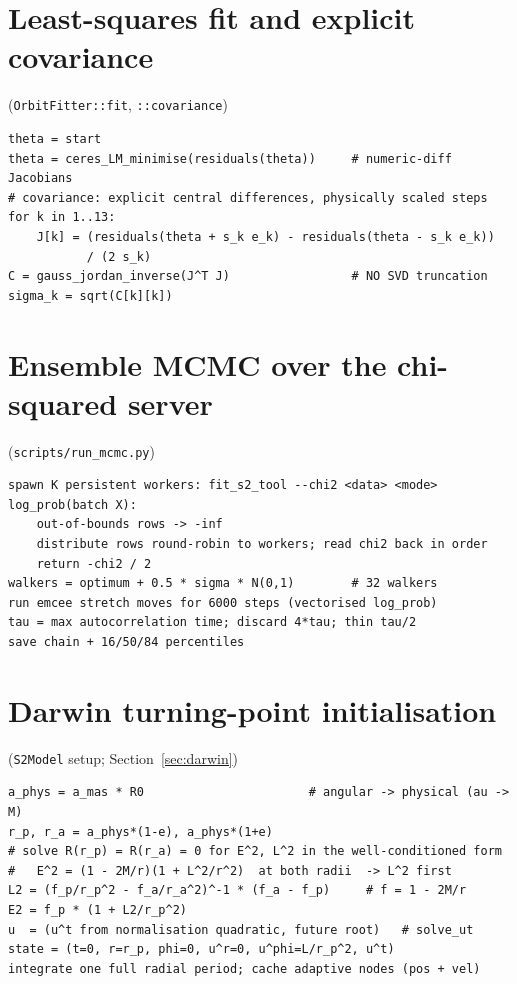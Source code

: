 \section{Least-squares fit and explicit covariance}
(\texttt{OrbitFitter::fit}, \texttt{::covariance})

\begin{verbatim}
theta = start
theta = ceres_LM_minimise(residuals(theta))     # numeric-diff Jacobians
# covariance: explicit central differences, physically scaled steps
for k in 1..13:
    J[k] = (residuals(theta + s_k e_k) - residuals(theta - s_k e_k))
           / (2 s_k)
C = gauss_jordan_inverse(J^T J)                 # NO SVD truncation
sigma_k = sqrt(C[k][k])
\end{verbatim}

\section{Ensemble MCMC over the chi-squared server}
(\texttt{scripts/run\_mcmc.py})

\begin{verbatim}
spawn K persistent workers: fit_s2_tool --chi2 <data> <mode>
log_prob(batch X):
    out-of-bounds rows -> -inf
    distribute rows round-robin to workers; read chi2 back in order
    return -chi2 / 2
walkers = optimum + 0.5 * sigma * N(0,1)        # 32 walkers
run emcee stretch moves for 6000 steps (vectorised log_prob)
tau = max autocorrelation time; discard 4*tau; thin tau/2
save chain + 16/50/84 percentiles
\end{verbatim}

\section{Darwin turning-point initialisation}
(\texttt{S2Model} setup; Section~\ref{sec:darwin})

\begin{verbatim}
a_phys = a_mas * R0                       # angular -> physical (au -> M)
r_p, r_a = a_phys*(1-e), a_phys*(1+e)
# solve R(r_p) = R(r_a) = 0 for E^2, L^2 in the well-conditioned form
#   E^2 = (1 - 2M/r)(1 + L^2/r^2)  at both radii  -> L^2 first
L2 = (f_p/r_p^2 - f_a/r_a^2)^-1 * (f_a - f_p)     # f = 1 - 2M/r
E2 = f_p * (1 + L2/r_p^2)
u  = (u^t from normalisation quadratic, future root)   # solve_ut
state = (t=0, r=r_p, phi=0, u^r=0, u^phi=L/r_p^2, u^t)
integrate one full radial period; cache adaptive nodes (pos + vel)
\end{verbatim}

